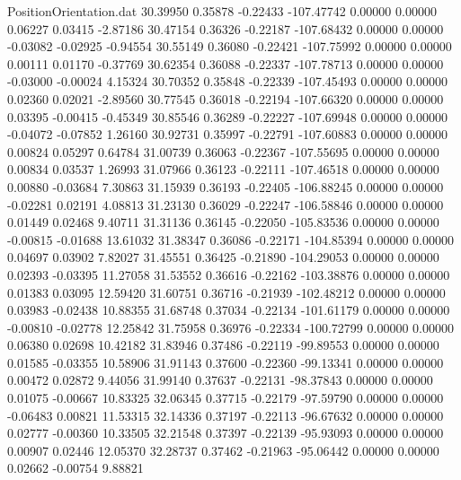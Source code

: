 \begin{filecontents}{PositionOrientation.dat}
  30.39950    0.35878   -0.22433  -107.47742    0.00000    0.00000    0.06227    0.03415   -2.87186
  30.47154    0.36326   -0.22187  -107.68432    0.00000    0.00000   -0.03082   -0.02925   -0.94554
  30.55149    0.36080   -0.22421  -107.75992    0.00000    0.00000    0.00111    0.01170   -0.37769
  30.62354    0.36088   -0.22337  -107.78713    0.00000    0.00000   -0.03000   -0.00024    4.15324
  30.70352    0.35848   -0.22339  -107.45493    0.00000    0.00000    0.02360    0.02021   -2.89560
  30.77545    0.36018   -0.22194  -107.66320    0.00000    0.00000    0.03395   -0.00415   -0.45349
  30.85546    0.36289   -0.22227  -107.69948    0.00000    0.00000   -0.04072   -0.07852    1.26160
  30.92731    0.35997   -0.22791  -107.60883    0.00000    0.00000    0.00824    0.05297    0.64784
  31.00739    0.36063   -0.22367  -107.55695    0.00000    0.00000    0.00834    0.03537    1.26993
  31.07966    0.36123   -0.22111  -107.46518    0.00000    0.00000    0.00880   -0.03684    7.30863
  31.15939    0.36193   -0.22405  -106.88245    0.00000    0.00000   -0.02281    0.02191    4.08813
  31.23130    0.36029   -0.22247  -106.58846    0.00000    0.00000    0.01449    0.02468    9.40711
  31.31136    0.36145   -0.22050  -105.83536    0.00000    0.00000   -0.00815   -0.01688   13.61032
  31.38347    0.36086   -0.22171  -104.85394    0.00000    0.00000    0.04697    0.03902    7.82027
  31.45551    0.36425   -0.21890  -104.29053    0.00000    0.00000    0.02393   -0.03395   11.27058
  31.53552    0.36616   -0.22162  -103.38876    0.00000    0.00000    0.01383    0.03095   12.59420
  31.60751    0.36716   -0.21939  -102.48212    0.00000    0.00000    0.03983   -0.02438   10.88355
  31.68748    0.37034   -0.22134  -101.61179    0.00000    0.00000   -0.00810   -0.02778   12.25842
  31.75958    0.36976   -0.22334  -100.72799    0.00000    0.00000    0.06380    0.02698   10.42182
  31.83946    0.37486   -0.22119   -99.89553    0.00000    0.00000    0.01585   -0.03355   10.58906
  31.91143    0.37600   -0.22360   -99.13341    0.00000    0.00000    0.00472    0.02872    9.44056
  31.99140    0.37637   -0.22131   -98.37843    0.00000    0.00000    0.01075   -0.00667   10.83325
  32.06345    0.37715   -0.22179   -97.59790    0.00000    0.00000   -0.06483    0.00821   11.53315
  32.14336    0.37197   -0.22113   -96.67632    0.00000    0.00000    0.02777   -0.00360   10.33505
  32.21548    0.37397   -0.22139   -95.93093    0.00000    0.00000    0.00907    0.02446   12.05370
  32.28737    0.37462   -0.21963   -95.06442    0.00000    0.00000    0.02662   -0.00754    9.88821

\end{filecontents}
